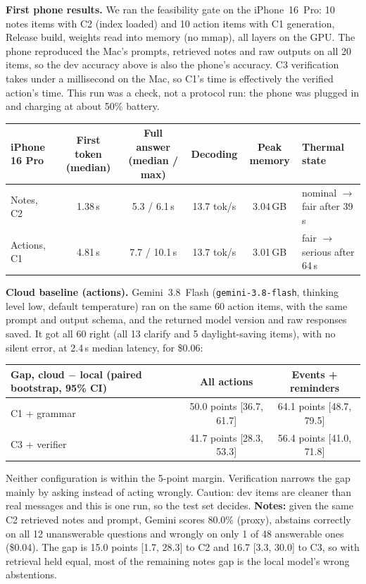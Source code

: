 \documentclass[10pt,letterpaper]{article}
\begin{document}
\textbf{First phone results.} We ran the feasibility gate on the iPhone~16~Pro: 10 notes items with C2 (index loaded) and 10 action items with C1 generation, Release build, weights read into memory (no mmap), all layers on the GPU. The phone reproduced the Mac's prompts, retrieved notes and raw outputs on all 20 items, so the dev accuracy above is also the phone's accuracy. C3 verification takes under a millisecond on the Mac, so C1's time is effectively the verified action's time. This run was a check, not a protocol run: the phone was plugged in and charging at about 50\% battery.

\begin{center}
\small
\begin{tabularx}{\textwidth}{@{}l c c c c L@{}}
\toprule
\textbf{iPhone 16 Pro} & \textbf{First token (median)} & \textbf{Full answer (median / max)} & \textbf{Decoding} & \textbf{Peak memory} & \textbf{Thermal state} \\
\midrule
Notes, C2 & 1.38\,s & 5.3 / 6.1\,s & 13.7 tok/s & 3.04\,GB & nominal $\rightarrow$ fair after 39\,s \\
Actions, C1 & 4.81\,s & 7.7 / 10.1\,s & 13.7 tok/s & 3.01\,GB & fair $\rightarrow$ serious after 64\,s \\
\bottomrule
\end{tabularx}
\end{center}

\textbf{Cloud baseline (actions).} Gemini~3.8~Flash (\texttt{gemini-3.8-flash}, thinking level low, default temperature) ran on the same 60 action items, with the same prompt and output schema, and the returned model version and raw responses saved. It got all 60 right (all 13 clarify and 5 daylight-saving items), with no silent error, at 2.4\,s median latency, for \$0.06:

\begin{center}
\small
\begin{tabular}{@{}l c c@{}}
\toprule
\textbf{Gap, cloud $-$ local (paired bootstrap, 95\% CI)} & \textbf{All actions} & \textbf{Events + reminders} \\
\midrule
C1 + grammar & 50.0 points [36.7, 61.7] & 64.1 points [48.7, 79.5] \\
C3 + verifier & 41.7 points [28.3, 53.3] & 56.4 points [41.0, 71.8] \\
\bottomrule
\end{tabular}
\end{center}

Neither configuration is within the 5-point margin. Verification narrows the gap mainly by asking instead of acting wrongly. Caution: dev items are cleaner than real messages and this is one run, so the test set decides. \textbf{Notes:} given the same C2 retrieved notes and prompt, Gemini scores 80.0\% (proxy), abstains correctly on all 12 unanswerable questions and wrongly on only 1 of 48 answerable ones (\$0.04). The gap is 15.0 points [1.7, 28.3] to C2 and 16.7 [3.3, 30.0] to C3, so with retrieval held equal, most of the remaining notes gap is the local model's wrong abstentions.
\end{document}
